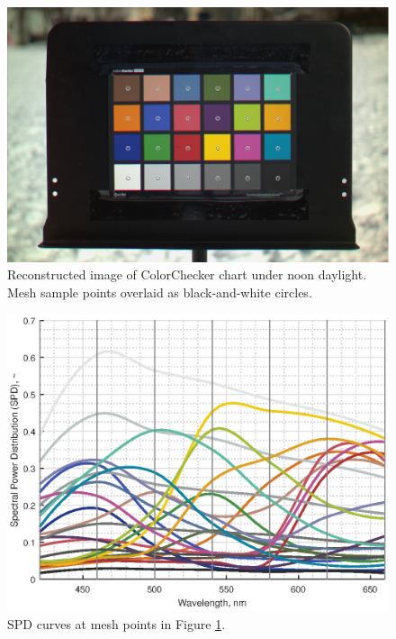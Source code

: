 \documentclass[twocolumn,10pt]{asme2ej}
\begin{document}
\begin{figure}[H]
\begin{centering}
  \includegraphics[height=0.55\linewidth]{colorchecker.png}
  \caption{Reconstructed image of ColorChecker chart under noon daylight. Mesh sample points overlaid as black-and-white circles.}
  \label{colorchecker_mesh}
  \end{centering}
\end{figure}

\begin{figure}[H]
\begin{centering}
  \includegraphics[height=0.6\linewidth]{colorchecker.eps}
  \caption{SPD curves at mesh points in Figure \ref{colorchecker_mesh}.}
  \label{colorchecker_SPDs}
    \end{centering}
\end{figure}

\clearpage
\end{document}
